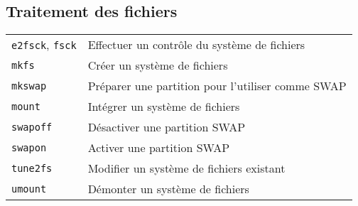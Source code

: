 \documentclass[10pt,a4paper]{article}
\begin{document}
\begin{multicols}{2} 
\section{Traitement des fichiers}
\begin{tabular}{ p{2.5cm} p{8.5cm} }
  \hline
  \texttt{e2fsck}, \texttt{fsck} & Effectuer un contrôle du système de fichiers \\
  \rowcolor{Gray}
  \texttt{mkfs} & Créer un système de fichiers \\
  \texttt{mkswap} & Préparer une partition pour l'utiliser comme SWAP \\
  \rowcolor{Gray}
  \texttt{mount} & Intégrer un système de fichiers \\
  \texttt{swapoff} & Désactiver une partition SWAP \\
  \rowcolor{Gray}
  \texttt{swapon} & Activer une partition SWAP \\
  \texttt{tune2fs} & Modifier un système de fichiers existant \\
  \rowcolor{Gray}
  \texttt{umount} & Démonter un système de fichiers \\
  \hline
\end{tabular}

~ \\


\end{multicols}
\end{document}
